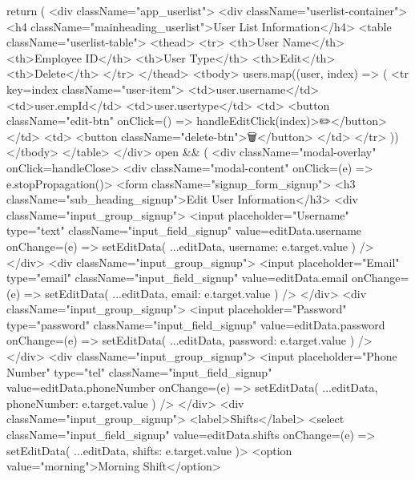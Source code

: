 {  return (
    <div className="app_userlist">
      <div className="userlist-container">
        <h4 className="mainheading_userlist">User List Information</h4>
        <table className="userlist-table">
          <thead>
            <tr>
              <th>User Name</th>
              <th>Employee ID</th>
              <th>User Type</th>
              <th>Edit</th>
              <th>Delete</th>
            </tr>
          </thead>
          <tbody>
            {users.map((user, index) => (
              <tr key={index} className="user-item">
                <td>{user.username}</td>
                <td>{user.empId}</td>
                <td>{user.usertype}</td>
                <td>
                  <button className="edit-btn" onClick={() => handleEditClick(index)}>✏️</button>
                </td>
                <td>
                  <button className="delete-btn">🗑️</button>
                </td>
              </tr>
            ))}
          </tbody>
        </table>
      </div>
      {open && (
        <div className="modal-overlay" onClick={handleClose}>
          <div className="modal-content" onClick={(e) => e.stopPropagation()}>
            <form className="signup_form_signup">
              <h3 className="sub_heading_signup">Edit User Information</h3>
              <div className="input_group_signup">
                <input placeholder="Username" type="text" className="input_field_signup" value={editData.username} onChange={(e) => setEditData({ ...editData, username: e.target.value })} />
              </div>
              <div className="input_group_signup">
                <input placeholder="Email" type="email" className="input_field_signup" value={editData.email} onChange={(e) => setEditData({ ...editData, email: e.target.value })} />
              </div>
              <div className="input_group_signup">
                <input placeholder="Password" type="password" className="input_field_signup" value={editData.password} onChange={(e) => setEditData({ ...editData, password: e.target.value })} />
              </div>
              <div className="input_group_signup">
                <input placeholder="Phone Number" type="tel" className="input_field_signup" value={editData.phoneNumber} onChange={(e) => setEditData({ ...editData, phoneNumber: e.target.value })} />
              </div>
              <div className="input_group_signup">
                <label>Shifts</label>
                <select className="input_field_signup" value={editData.shifts} onChange={(e) => setEditData({ ...editData, shifts: e.target.value })}>
                  <option value="morning">Morning Shift</option>
}}
